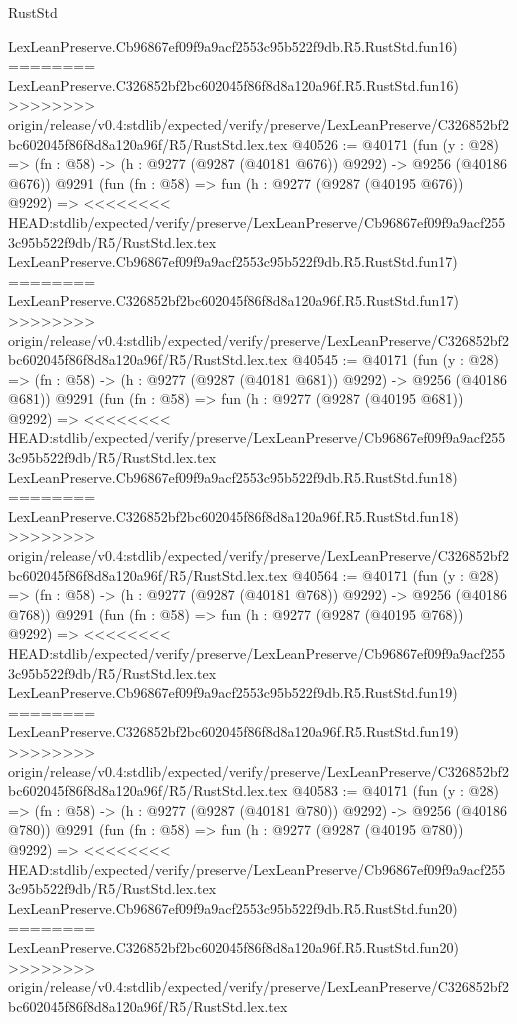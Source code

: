 \begin{lexlean}{RustStd}
\begin{coremodule}
{\begin{coremodule}
{{{{{{{{{{{{{{{{{{{{{{{{{{{{{{{{{{{{{{{{{{{{{{{{{{{{{{{    LexLeanPreserve.Cb96867ef09f9a9acf2553c95b522f9db.R5.RustStd.fun16)
========
    LexLeanPreserve.C326852bf2bc602045f86f8d8a120a96f.R5.RustStd.fun16)
>>>>>>>> origin/release/v0.4:stdlib/expected/verify/preserve/LexLeanPreserve/C326852bf2bc602045f86f8d8a120a96f/R5/RustStd.lex.tex
@40526 := @40171
    (fun (y : @28) => (fn : @58) -> (h : @9277 (@9287 (@40181 @676)) @9292) -> @9256 (@40186 @676))
    @9291
    (fun (fn : @58) =>
    fun (h : @9277 (@9287 (@40195 @676)) @9292) =>
<<<<<<<< HEAD:stdlib/expected/verify/preserve/LexLeanPreserve/Cb96867ef09f9a9acf2553c95b522f9db/R5/RustStd.lex.tex
    LexLeanPreserve.Cb96867ef09f9a9acf2553c95b522f9db.R5.RustStd.fun17)
========
    LexLeanPreserve.C326852bf2bc602045f86f8d8a120a96f.R5.RustStd.fun17)
>>>>>>>> origin/release/v0.4:stdlib/expected/verify/preserve/LexLeanPreserve/C326852bf2bc602045f86f8d8a120a96f/R5/RustStd.lex.tex
@40545 := @40171
    (fun (y : @28) => (fn : @58) -> (h : @9277 (@9287 (@40181 @681)) @9292) -> @9256 (@40186 @681))
    @9291
    (fun (fn : @58) =>
    fun (h : @9277 (@9287 (@40195 @681)) @9292) =>
<<<<<<<< HEAD:stdlib/expected/verify/preserve/LexLeanPreserve/Cb96867ef09f9a9acf2553c95b522f9db/R5/RustStd.lex.tex
    LexLeanPreserve.Cb96867ef09f9a9acf2553c95b522f9db.R5.RustStd.fun18)
========
    LexLeanPreserve.C326852bf2bc602045f86f8d8a120a96f.R5.RustStd.fun18)
>>>>>>>> origin/release/v0.4:stdlib/expected/verify/preserve/LexLeanPreserve/C326852bf2bc602045f86f8d8a120a96f/R5/RustStd.lex.tex
@40564 := @40171
    (fun (y : @28) => (fn : @58) -> (h : @9277 (@9287 (@40181 @768)) @9292) -> @9256 (@40186 @768))
    @9291
    (fun (fn : @58) =>
    fun (h : @9277 (@9287 (@40195 @768)) @9292) =>
<<<<<<<< HEAD:stdlib/expected/verify/preserve/LexLeanPreserve/Cb96867ef09f9a9acf2553c95b522f9db/R5/RustStd.lex.tex
    LexLeanPreserve.Cb96867ef09f9a9acf2553c95b522f9db.R5.RustStd.fun19)
========
    LexLeanPreserve.C326852bf2bc602045f86f8d8a120a96f.R5.RustStd.fun19)
>>>>>>>> origin/release/v0.4:stdlib/expected/verify/preserve/LexLeanPreserve/C326852bf2bc602045f86f8d8a120a96f/R5/RustStd.lex.tex
@40583 := @40171
    (fun (y : @28) => (fn : @58) -> (h : @9277 (@9287 (@40181 @780)) @9292) -> @9256 (@40186 @780))
    @9291
    (fun (fn : @58) =>
    fun (h : @9277 (@9287 (@40195 @780)) @9292) =>
<<<<<<<< HEAD:stdlib/expected/verify/preserve/LexLeanPreserve/Cb96867ef09f9a9acf2553c95b522f9db/R5/RustStd.lex.tex
    LexLeanPreserve.Cb96867ef09f9a9acf2553c95b522f9db.R5.RustStd.fun20)
========
    LexLeanPreserve.C326852bf2bc602045f86f8d8a120a96f.R5.RustStd.fun20)
>>>>>>>> origin/release/v0.4:stdlib/expected/verify/preserve/LexLeanPreserve/C326852bf2bc602045f86f8d8a120a96f/R5/RustStd.lex.tex
}}}}}}}}}}}}}}}}}}}}}}}}}}}}}}}}}}}}}}}}}}}}}}}}}}}}}}}
\end{coremodule}}
\end{coremodule}
\end{lexlean}
